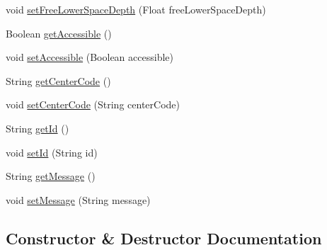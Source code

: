 \begin{DoxyCompactItemize}
\item 
void \mbox{\hyperlink{classcom_1_1osoc_1_1oncera_1_1javabean_1_1_att_points_a4377af2cb6d49209d9af481e98e75352}{set\+Free\+Lower\+Space\+Depth}} (Float free\+Lower\+Space\+Depth)
\item 
Boolean \mbox{\hyperlink{classcom_1_1osoc_1_1oncera_1_1javabean_1_1_att_points_a3a4c0eb25b4b6a2335d1bee1e98913cd}{get\+Accessible}} ()
\item 
void \mbox{\hyperlink{classcom_1_1osoc_1_1oncera_1_1javabean_1_1_att_points_a64fd49cfc7b7463516069f9534cc5447}{set\+Accessible}} (Boolean accessible)
\item 
String \mbox{\hyperlink{classcom_1_1osoc_1_1oncera_1_1javabean_1_1_att_points_aa5a1ff982c7c04af63aa3bd16c9a332a}{get\+Center\+Code}} ()
\item 
void \mbox{\hyperlink{classcom_1_1osoc_1_1oncera_1_1javabean_1_1_att_points_a0a796c44dc6e5d7f5f761436366fc291}{set\+Center\+Code}} (String center\+Code)
\item 
String \mbox{\hyperlink{classcom_1_1osoc_1_1oncera_1_1javabean_1_1_att_points_a729602ffa13f8b157d9aeab0120fbe5c}{get\+Id}} ()
\item 
void \mbox{\hyperlink{classcom_1_1osoc_1_1oncera_1_1javabean_1_1_att_points_aaa9f859cd37f6273cb6a414ac303a839}{set\+Id}} (String id)
\item 
String \mbox{\hyperlink{classcom_1_1osoc_1_1oncera_1_1javabean_1_1_att_points_a49386602dcd87ad5689c0acb92283cf1}{get\+Message}} ()
\item 
void \mbox{\hyperlink{classcom_1_1osoc_1_1oncera_1_1javabean_1_1_att_points_a2a9168bfec57831b918cd88639690a79}{set\+Message}} (String message)
\end{DoxyCompactItemize}


\subsection{Constructor \& Destructor Documentation}
\mbox{\label{classcom_1_1osoc_1_1oncera_1_1javabean_1_1_att_points_a53cc61d2a58f48ad4375473e05d181f4}} 
